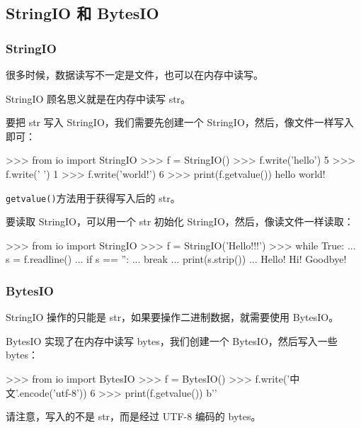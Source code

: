 \hypertarget{stringio-ux548c-bytesio}{%
\subsection{StringIO 和 BytesIO}\label{stringio-ux548c-bytesio}}

\hypertarget{stringio}{%
\subsubsection{StringIO}\label{stringio}}

很多时候，数据读写不一定是文件，也可以在内存中读写。

StringIO 顾名思义就是在内存中读写 str。

要把 str 写入 StringIO，我们需要先创建一个
StringIO，然后，像文件一样写入即可：

\begin{pythoncode}
>>> from io import StringIO
>>> f = StringIO()
>>> f.write('hello')
5
>>> f.write(' ')
1
>>> f.write('world!')
6
>>> print(f.getvalue())
hello world!
\end{pythoncode}

\texttt{getvalue()}方法用于获得写入后的 str。

要读取 StringIO，可以用一个 str 初始化
StringIO，然后，像读文件一样读取：

\begin{pythoncode}
>>> from io import StringIO
>>> f = StringIO('Hello!\nHi!\nGoodbye!')
>>> while True:
...     s = f.readline()
...     if s == '':
...         break
...     print(s.strip())
...
Hello!
Hi!
Goodbye!
\end{pythoncode}

\hypertarget{bytesio}{%
\subsubsection{BytesIO}\label{bytesio}}

StringIO 操作的只能是 str，如果要操作二进制数据，就需要使用 BytesIO。

BytesIO 实现了在内存中读写 bytes，我们创建一个 BytesIO，然后写入一些
bytes：

\begin{pythoncode}
>>> from io import BytesIO
>>> f = BytesIO()
>>> f.write('中文'.encode('utf-8'))
6
>>> print(f.getvalue())
b'\xad{}'
\end{pythoncode}

请注意，写入的不是 str，而是经过 UTF-8 编码的 bytes。

